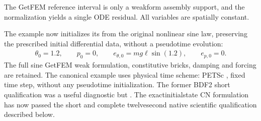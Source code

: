 \documentclass[letterpaper,10pt,english]{sphinxmanual}
\begin{document}
\sphinxAtStartPar
The GetFEM reference interval is only a weak\sphinxhyphen{}form assembly support,
and the  normalization yields a single ODE residual.
All variables are spatially constant.

\sphinxAtStartPar
The example now initializes its 
from the original nonlinear sine law, preserving the prescribed
initial differential data, without a pseudo\sphinxhyphen{}time evolution:
\begin{equation*}
\begin{split}\theta_0=1.2,\qquad p_0=0,\qquad
e_{\theta,0}=mg\ell\sin(1.2),\qquad e_{p,0}=0.\end{split}
\end{equation*}
\sphinxAtStartPar
The full sine GetFEM weak formulation, constitutive bricks,
damping and forcing are retained. The canonical example uses
 physical time scheme: PETSc , fixed time step,
without any pseudo\sphinxhyphen{}time initialization. The former BDF2 short
qualification was a useful diagnostic but .
The exact\sphinxhyphen{}initial\sphinxhyphen{}state CN formulation has now passed
the short and complete twelve\sphinxhyphen{}second native scientific
qualification described below.
\end{document}
